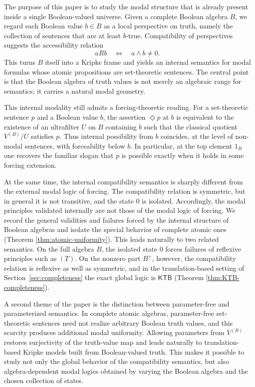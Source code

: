 \documentclass[11pt]{amsart}
\theoremstyle{definition}
\theoremstyle{plain}
\newcommand{\KTB}{\mathsf{KTB}}
\begin{document}
The purpose of this paper is to study the modal structure that is already present inside a single
Boolean-valued universe. Given a complete Boolean algebra $B$, we regard each Boolean value
$b\in B$ as a local perspective on truth, namely the collection of sentences that are at least
$b$-true. Compatibility of perspectives suggests the accessibility relation
\[
aRb \quad\Longleftrightarrow\quad a\wedge b\neq 0.
\]
This turns $B$ itself into a Kripke frame and yields an internal semantics for modal formulas whose
atomic propositions are set-theoretic sentences. The central point is that the Boolean algebra of
truth values is not merely an algebraic range for semantics; it carries a natural modal geometry.

This internal modality still admits a forcing-theoretic reading. For a set-theoretic sentence $p$ and
a Boolean value $b$, the assertion $\Diamond p$ at $b$ is equivalent to the existence of an ultrafilter
$U$ on $B$ containing $b$ such that the classical quotient $V^{(B)}/U$ satisfies $p$. Thus internal
possibility from $b$ coincides, at the level of non-modal sentences, with forceability below $b$. In
particular, at the top element $1_B$ one recovers the familiar slogan that $p$ is possible exactly
when it holds in some forcing extension.

At the same time, the internal compatibility semantics is sharply different from the external modal
logic of forcing. The compatibility relation is symmetric, but in general it is not transitive, and the state $0$ is isolated. Accordingly, the modal principles validated internally are not
those of the modal logic of forcing. We record the general validities and failures forced by the internal structure of Boolean algebras
and isolate the special behavior of complete atomic ones (Theorem \ref{thm:atomic-uniformity}). This leads naturally to two
related semantics. On the full algebra $B$, the isolated state $0$ forces failures of reflexive
principles such as $(T)$. On the nonzero part $B^+$, however, the compatibility relation is reflexive
as well as symmetric, and in the translation-based setting of Section~\ref{sec:completeness} the exact
global logic is $\KTB$ (Theorem \ref{thm:KTB-completeness}).

A second theme of the paper is the distinction between parameter-free and parameterized
semantics. In complete atomic algebras, parameter-free set-theoretic sentences need not realize
arbitrary Boolean truth values, and this scarcity produces additional modal uniformity. Allowing
parameters from $V^{(B)}$ restores surjectivity of the truth-value map and leads naturally to
translation-based Kripke models built from Boolean-valued truth. This makes it possible to study
not only the global behavior of the compatibility semantics, but also algebra-dependent modal logics
obtained by varying the Boolean algebra and the chosen collection of states.
\end{document}
